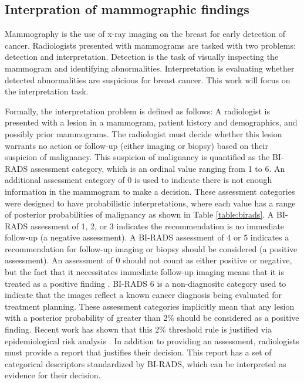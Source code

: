 \subsection{Interpration of mammographic findings}
Mammography is the use of x-ray imaging on the breast for early detection of cancer. Radiologists presented with mammograms are tasked with two problems: detection and interpretation. Detection is the task of visually inspecting the mammogram and identifying abnormalities. Interpretation is evaluating whether detected abnormalities are suspicious for breast cancer. This work will focus on the interpretation task.

Formally, the interpretation problem is defined as follows: A radiologist is presented with a lesion in a mammogram, patient history and demographics, and possibly prior mammograms. The radiologist must decide whether this lesion warrants no action or follow-up (either imaging or biopsy) based on their suspicion of malignancy. This suspicion of malignancy is quantified as the BI-RADS assessment category, which is an ordinal value ranging from 1 to 6. An additional assessment category of 0 is used to indicate there is not enough information in the mammogram to make a decision. These assessment categories were designed to have probabilistic interpretations, where each value has a range of posterior probabilities of malignancy as shown in Table \ref{table:birads}. A BI-RADS assessment of 1, 2, or 3 indicates the recommendation is no immediate follow-up (a negative assessment). A BI-RADS assessment of 4 or 5 indicates a recommendation for follow-up imaging or biopsy should be considered (a positive assessment). An assessment of 0 should not count as either positive or negative, but the fact that it necessitates immediate follow-up imaging means that it is treated as a positive finding \cite{Barlow:2004cy}. BI-RADS 6 is a non-diagnositc category used to indicate that the images reflect a known cancer diagnosis being evaluated for treatment planning. These assessment categories implicitly mean that any lesion with a posterior probability of greater than 2\% should be considered as a positive finding. Recent work has shown that this 2\% threshold rule is justified via epidemiological risk analysis \cite{Burnside:2012fk}. In addition to providing an assessment, radiologists must provide a report that justifies their decision. This report has a set of categorical descriptors standardized by BI-RADS, which can be interpreted as evidence for their decision.

